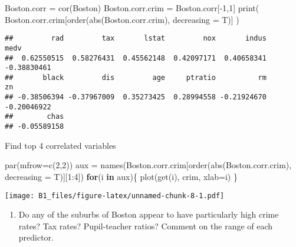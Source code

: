 \documentclass[
]{article}
\newenvironment{Shaded}{\begin{snugshade}}{\end{snugshade}}
\newcommand{\AttributeTok}[1]{\textcolor[rgb]{0.77,0.63,0.00}{#1}}
\newcommand{\ControlFlowTok}[1]{\textcolor[rgb]{0.13,0.29,0.53}{\textbf{#1}}}
\newcommand{\DecValTok}[1]{\textcolor[rgb]{0.00,0.00,0.81}{#1}}
\newcommand{\FunctionTok}[1]{\textcolor[rgb]{0.00,0.00,0.00}{#1}}
\newcommand{\NormalTok}[1]{#1}
\newcommand{\OtherTok}[1]{\textcolor[rgb]{0.56,0.35,0.01}{#1}}
\newcommand{\SpecialCharTok}[1]{\textcolor[rgb]{0.00,0.00,0.00}{#1}}
\providecommand{\tightlist}{%
  \setlength{\itemsep}{0pt}\setlength{\parskip}{0pt}}
\begin{document}
\begin{Shaded}
\begin{Highlighting}[]
\NormalTok{Boston.corr }\OtherTok{=} \FunctionTok{cor}\NormalTok{(Boston)}
\NormalTok{Boston.corr.crim }\OtherTok{=}\NormalTok{ Boston.corr[}\SpecialCharTok{{-}}\DecValTok{1}\NormalTok{,}\DecValTok{1}\NormalTok{]}
\FunctionTok{print}\NormalTok{(}
\NormalTok{  Boston.corr.crim[}\FunctionTok{order}\NormalTok{(}\FunctionTok{abs}\NormalTok{(Boston.corr.crim), }\AttributeTok{decreasing =}\NormalTok{ T)]}
\NormalTok{)}
\end{Highlighting}
\end{Shaded}

\begin{verbatim}
##         rad         tax       lstat         nox       indus        medv 
##  0.62550515  0.58276431  0.45562148  0.42097171  0.40658341 -0.38830461 
##       black         dis         age     ptratio          rm          zn 
## -0.38506394 -0.37967009  0.35273425  0.28994558 -0.21924670 -0.20046922 
##        chas 
## -0.05589158
\end{verbatim}

Find top 4 correlated variables

\begin{Shaded}
\begin{Highlighting}[]
\FunctionTok{par}\NormalTok{(}\AttributeTok{mfrow=}\FunctionTok{c}\NormalTok{(}\DecValTok{2}\NormalTok{,}\DecValTok{2}\NormalTok{))}
\NormalTok{aux }\OtherTok{=} \FunctionTok{names}\NormalTok{(Boston.corr.crim[}\FunctionTok{order}\NormalTok{(}\FunctionTok{abs}\NormalTok{(Boston.corr.crim), }\AttributeTok{decreasing =}\NormalTok{ T)][}\DecValTok{1}\SpecialCharTok{:}\DecValTok{4}\NormalTok{])}
\ControlFlowTok{for}\NormalTok{(i }\ControlFlowTok{in}\NormalTok{ aux)\{}
  \FunctionTok{plot}\NormalTok{(}\FunctionTok{get}\NormalTok{(i), crim, }\AttributeTok{xlab=}\NormalTok{i)}
\NormalTok{\}}
\end{Highlighting}
\end{Shaded}

\texttt{[image: B1\_files/figure-latex/unnamed-chunk-8-1.pdf]}

\begin{enumerate}
\def\labelenumi{(\alph{enumi})}
\setcounter{enumi}{3}
\tightlist
\item
  Do any of the suburbs of Boston appear to have particularly high crime
  rates? Tax rates? Pupil-teacher ratios? Comment on the range of each
  predictor.
\end{enumerate}
\end{document}
